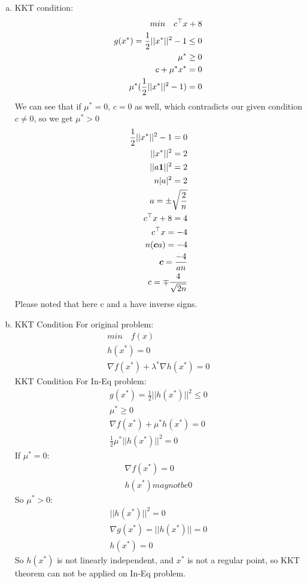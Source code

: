 \documentclass[12pt,twoside]{article}
\begin{document}
\begin{enumerate}[a)]
\item 
KKT condition:
\begin{align}
min \quad c^\top x + 8\\
g(x^*) = \frac{1}{2} ||x^*||^2 -1 \leq 0\\
\mu^* \geq 0\\
c + \mu^* x^* = 0\\
\mu^* (\frac{1}{2} ||x^*||^2 -1) = 0
\end{align}
We can see that if $\mu^* = 0$, $c=0$ as well, which contradicts our given condition $c \neq 0$, so we get $\mu^* > 0$
\begin{align}
\frac{1}{2} ||x^*||^2 -1 = 0\\
||x^*||^2 = 2\\
||a {\boldsymbol{{1}}}||^2 = 2\\
n|a|^2 = 2\\
a = \pm \sqrt{\frac{2}{n}}\\
c^\top x + 8 = 4\\
c^\top x = -4\\
n({\boldsymbol{{c}}} a) = -4\\
{\boldsymbol{{c}}} = \frac{-4}{an}\\
c = \mp \frac{4}{\sqrt{2n}}
\end{align}
Please noted that here c and a have inverse signs.

\item 
KKT Condition For original problem:
\begin{align}
min \quad f(x)\\
h(x^*) = 0\\
\nabla f(x^*) + \lambda^* \nabla h(x^*) = 0
\end{align}
KKT Condition For In-Eq problem:
\begin{align}
g(x^*) = \frac{1}{2}||h(x^*)||^2 \leq 0\\
\mu^* \geq 0\\
\nabla f(x^*) + \mu^* h(x^*) = 0\\
\frac{1}{2} \mu^* ||h(x^*)||^2 = 0
\end{align}
If $\mu^* = 0$:
\begin{align}
\nabla f(x^*) = 0\\
h(x^*) may not be 0
\end{align}
So $\mu^* > 0$:
\begin{align}
||h(x^*)||^2 = 0\\
\nabla g(x^*) = ||h(x^*)|| = 0\\
h(x^*) = 0
\end{align}
So $h(x^*)$ is not linearly independent, and $x^*$ is not a regular point, so KKT theorem can not be applied on In-Eq problem.


\end{enumerate}
\end{document}
